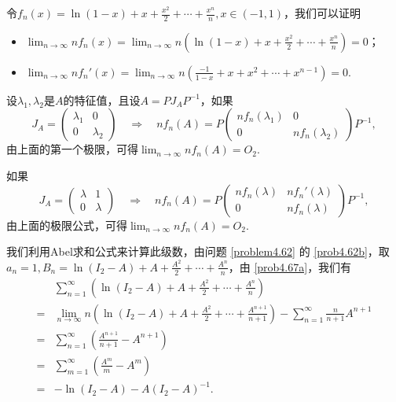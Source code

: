 \begin{solution}
  \begin{inparaenum}[(a)]
    \item 令$f_n(x)=\ln(1-x)+x+\frac{x^2}2+\cdots
        +\frac{x^n}n,x\in(-1,1)$，我们可以证明
  \end{inparaenum}
  \begin{itemize}
    \item $\lim_{n\to\infty}nf_n(x)=\lim_{n\to\infty}
        n\left(\ln(1-x)+x+\frac{x^2}2+\cdots
        +\frac{x^n}n\right)=0$；
    \item $\lim_{n\to\infty}nf_n'(x)=\lim_{n\to\infty}
        n\left(\frac{-1}{1-x}+x+x^2+\cdots+x^{n-1}
        \right)=0$.
  \end{itemize}

  设$\lambda_1,\lambda_2$是$A$的特征值，且设$A=PJ_AP^{-1} $，如果
  \[
    J_A = \begin{pmatrix}
      \lambda_1 & 0 \\
      0 & \lambda_2
    \end{pmatrix} \quad \Rightarrow \quad
    nf_n(A) = P
    \begin{pmatrix}
      nf_n(\lambda_1) & 0 \\
      0 & nf_n(\lambda_2)
    \end{pmatrix} P^{-1},
  \]
  由上面的第一个极限，可得$\lim_{n\to\infty}nf_n(A)=O_2$.

  如果
  \[
    J_A = \begin{pmatrix}
      \lambda & 1 \\
      0 & \lambda
    \end{pmatrix} \quad \Rightarrow \quad
    nf_n(A) = P \begin{pmatrix}
      nf_n(\lambda) & nf_n'(\lambda) \\
      0 & nf_n(\lambda)
    \end{pmatrix} P^{-1},
  \]
  由上面的极限公式，可得$\lim_{n\to\infty}nf_n(A)=O_2$.

  \begin{inparaenum}[(a)]
    \setcounter{enumi}{1}
    \item 我们利用Abel求和公式来计算此级数，由问题 \ref{problem4.62} 的 \ref{prob4.62b}，取$a_n=1,B_n=\ln(I_2-A)+A+
        \frac{A^2}2+\cdots+\frac{A^n}n$，由 \ref{prob4.67a}，我们有
        \begin{align*}
          & \sum_{n=1}^\infty \left( \ln(I_2-A) + A + \frac{A^2}2 + \cdots + \frac{A^n}n \right) \\
          = {}& \lim_{n\to\infty} n \left( \ln(I_2 - A) + A + \frac{A^2}2 + \cdots + \frac{A^{n+1}}{n+1} \right) - \sum_{n=1}^\infty \frac n{n+1}A^{n+1} \\
          = {}& \sum_{n=1}^\infty \left( \frac{A^{n+1}}{n+1} - A^{n+1} \right) \\
          = {}& \sum_{m=1}^\infty \left( \frac{A^m}m - A^m \right) \\
          = {}& - \ln(I_2-A) - A(I_2 - A)^{-1}.
        \end{align*}
  \end{inparaenum}
\end{solution}

